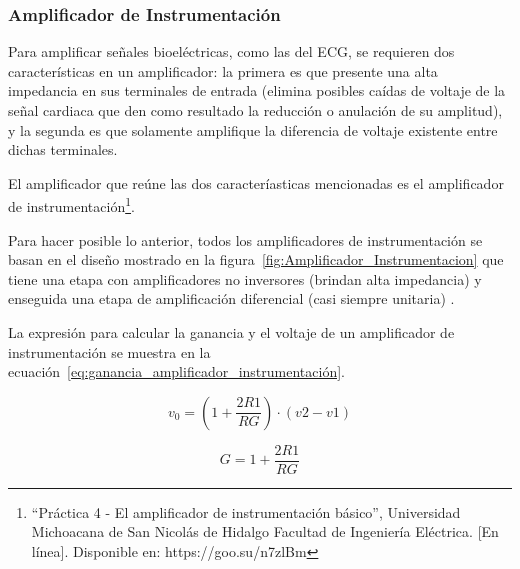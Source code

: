         \subsubsection{Amplificador de Instrumentación}
            Para amplificar señales bioeléctricas, como las del ECG, se requieren dos características en un amplificador: la primera es que presente una alta impedancia en sus terminales de entrada (elimina posibles caídas de voltaje de la señal cardiaca que den como resultado la reducción o anulación de su amplitud), y la segunda es que solamente amplifique la diferencia de voltaje existente entre dichas terminales. 
            
            El amplificador que reúne las dos caracteríasticas mencionadas es el amplificador de instrumentación\footnote{``Práctica 4 - El amplificador de instrumentación básico'', Universidad Michoacana de San Nicolás de Hidalgo Facultad de Ingeniería Eléctrica. [En línea]. Disponible en: https://goo.su/n7zlBm}.

            Para hacer posible lo anterior, todos los amplificadores de instrumentación se basan en el diseño mostrado en la figura~\ref{fig:Amplificador_Instrumentacion} que tiene una etapa con amplificadores no inversores (brindan alta impedancia) y enseguida una etapa de amplificación diferencial (casi siempre unitaria) \cite{Diaz_amplificacion_señales}.

            La expresión para calcular la ganancia y el voltaje de un amplificador de instrumentación se muestra en la ecuación~\ref{eq:ganancia_amplificador_instrumentación}.

            \begin{equation}
                \label{eq:voltaje_amplificador_instrumentación}
                v_0 = (1 + \frac{2R1}{RG}) \cdot (v2 - v1)
            \end{equation}

            \begin{equation}
                \label{eq:ganancia_amplificador_instrumentación}
                G = 1 + \frac{2R1}{RG}
            \end{equation}

